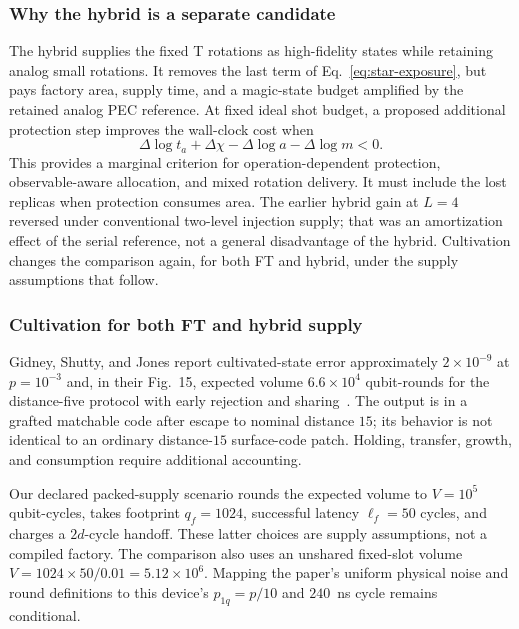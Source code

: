 \documentclass[11pt]{article}
\begin{document}
\subsubsection{Why the hybrid is a separate candidate}
The hybrid supplies the fixed T rotations as high-fidelity states while
retaining analog small rotations. It removes the last term of
Eq.~\eqref{eq:star-exposure}, but pays factory area, supply time, and a
magic-state budget amplified by the retained analog PEC reference.
At fixed ideal shot budget, a proposed additional protection step improves
the wall-clock cost when
\begin{equation}\label{eq:hybrid-v0}
 \Delta\log t_a+\Delta\chi-\Delta\log a-\Delta\log m<0.
\end{equation}
This provides a marginal criterion for operation-dependent protection,
observable-aware allocation, and mixed rotation delivery. It must include
the lost replicas when protection consumes area. The earlier hybrid gain
at $L=4$ reversed under conventional two-level injection supply; that was
an amortization effect of the serial reference, not a general disadvantage
of the hybrid. Cultivation changes the comparison again, for both FT and
hybrid, under the supply assumptions that follow.

\subsubsection{Cultivation for both FT and hybrid supply}
Gidney, Shutty, and Jones report cultivated-state error approximately
$2\times10^{-9}$ at $p=10^{-3}$ and, in their Fig.~15, expected volume
$6.6\times10^4$ qubit-rounds for the distance-five protocol with early
rejection and sharing~\cite{gidney2024cultivation}. The output is in a
grafted matchable code after escape to nominal distance $15$; its behavior
is not identical to an ordinary distance-$15$ surface-code patch. Holding,
transfer, growth, and consumption require additional accounting.

Our declared packed-supply scenario rounds the expected volume to
$V=10^5$ qubit-cycles, takes footprint $q_f=1024$, successful latency
$\ell_f=50$ cycles, and charges a $2d$-cycle handoff. These latter choices
are supply assumptions, not a compiled factory. The comparison also uses
an unshared fixed-slot volume $V=1024\times50/0.01=5.12\times10^6$.
Mapping the paper's uniform physical noise and round definitions to this
device's $p_{1q}=p/10$ and $240$~ns cycle remains conditional.
\end{document}
